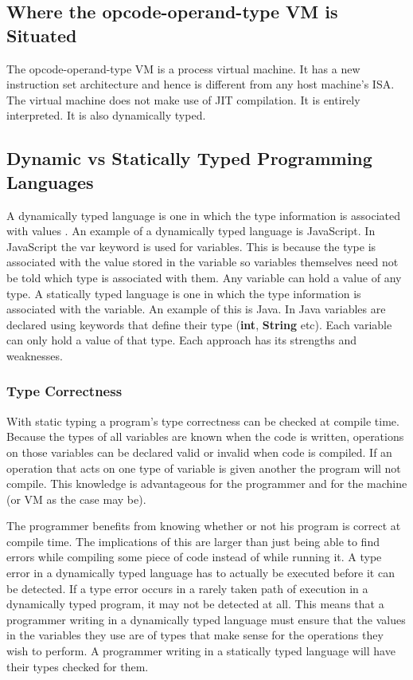\documentclass[english,a4paper]{article}
\begin{document}
\subsection{Where the opcode-operand-type VM is Situated}
The opcode-operand-type VM is a process virtual machine. It has a new
instruction set architecture and hence is different from any host
machine's ISA. The virtual machine does not make use of JIT
compilation. It is entirely interpreted. It is also dynamically typed.

\subsection{Dynamic vs Statically Typed Programming Languages}
A dynamically typed language is one in which the type information is
associated with values \cite[pg4]{RobertoIerusalimschy}. An example of
a dynamically typed language is JavaScript. In JavaScript the var
keyword is used for variables. This is because the type is associated
with the value stored in the variable so variables themselves need not
be told which type is associated with them. Any variable can hold a
value of any type. A statically typed language is one in which the
type information is associated with the variable. An example of this
is Java. In Java variables are declared using keywords that define
their type (\textbf{int}, \textbf{String} etc). Each variable can only
hold a value of that type. Each approach has its strengths and
weaknesses.

\subsubsection{Type Correctness}
With static typing a program's type correctness can be checked at
compile time. Because the types of all variables are known when the
code is written, operations on those variables can be declared valid
or invalid when code is compiled. If an operation that acts on one
type of variable is given another the program will not compile. This
knowledge is advantageous for the programmer and for the machine (or
VM as the case may be).

The programmer benefits from knowing whether or not his program is
correct at compile time. The implications of this are larger than just
being able to find errors while compiling some piece of code instead
of while running it. A type error in a dynamically typed language has
to actually be executed before it can be detected. If a type error
occurs in a rarely taken path of execution in a dynamically typed
program, it may not be detected at all. This means that a programmer
writing in a dynamically typed language must ensure that the values in
the variables they use are of types that make sense for the operations
they wish to perform. A programmer writing in a statically typed
language will have their types checked for them.
\end{document}
